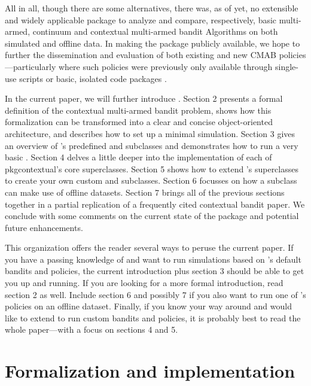 \documentclass{jss}
\begin{document}
All in all, though there are some alternatives, there was, as of yet, no extensible and widely applicable  package to analyze and compare, respectively, basic multi-armed, continuum \citep{Agrawal1995} and contextual multi-armed bandit Algorithms on both simulated and offline data. In making the package publicly available, we hope to further the dissemination and evaluation of both existing and new CMAB policies---particularly where such policies were previously only available through single-use scripts or basic, isolated code packages \citep{Gandrud2016}.

In the current paper, we will further introduce . Section 2 presents a formal definition of the contextual multi-armed bandit problem, shows how this formalization can be transformed into a clear and concise object-oriented architecture, and describes how to set up a minimal simulation. Section 3 gives an overview of 's predefined  and  subclasses and demonstrates how to run a very basic . Section 4 delves a little deeper into the implementation of each of pkg{contextual}'s core superclasses. Section 5 shows how to extend 's superclasses to create your own custom  and  subclasses. Section 6 focusses on how a  subclass can make use of offline datasets. Section 7 brings all of the previous sections together in a partial replication of a frequently cited contextual bandit paper. We conclude with some comments on the current state of the package and potential future enhancements.

This organization offers the reader several ways to peruse the current paper. If you have a passing knowledge of  and want to run simulations based on 's default bandits and policies, the current introduction plus section 3 should be able to get you up and running. If you are looking for a more formal introduction, read section 2 as well. Include section 6 and possibly 7 if you also want to run one of 's policies on an offline dataset. Finally, if you know your way around  and would like to extend  to run custom bandits and policies, it is probably best to read the whole paper---with a focus on sections 4 and 5.

\section{Formalization and implementation} \label{formalizationandimplementation}
\end{document}
